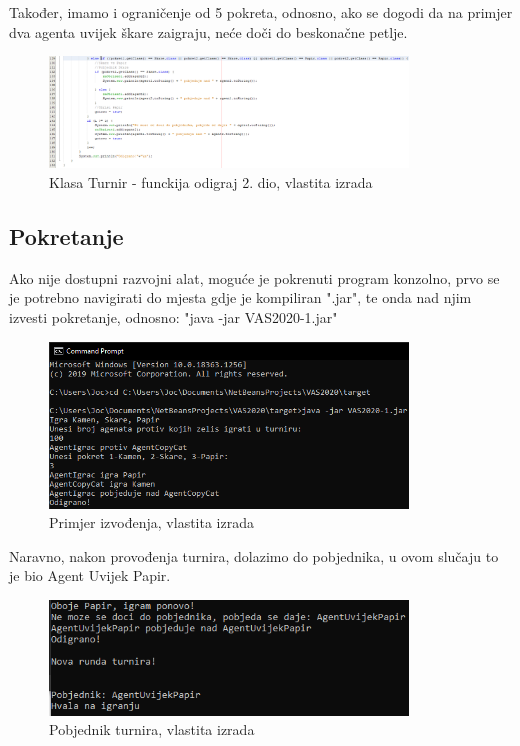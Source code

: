 \documentclass{foi}
\begin{document}
Također, imamo i ograničenje od 5 pokreta, odnosno, ako se dogodi da na primjer dva agenta uvijek škare zaigraju, neće doči do beskonačne petlje.

\begin{figure}[h!]
    \centering
    \includegraphics[width=0.85\textwidth]{slike/Screenshot_17.png}
    \caption{Klasa Turnir - funckija odigraj 2. dio, vlastita izrada}
\end{figure}
\clearpage

\subsection{Pokretanje}

Ako nije dostupni razvojni alat, moguće je pokrenuti program konzolno, prvo se je potrebno navigirati do mjesta gdje je kompiliran ".jar", te onda nad njim izvesti pokretanje, odnosno:
"java -jar VAS2020-1.jar"

\begin{figure}[h!]
    \centering
    \includegraphics[width=0.85\textwidth]{slike/Screenshot_18.png}
    \caption{Primjer izvođenja, vlastita izrada}
\end{figure}

Naravno, nakon provođenja turnira, dolazimo do pobjednika, u ovom slučaju to je bio Agent Uvijek Papir.

\begin{figure}[h!]
    \centering
    \includegraphics[width=0.85\textwidth]{slike/Screenshot_19.png}
    \caption{Pobjednik turnira, vlastita izrada}
\end{figure}
\end{document}
